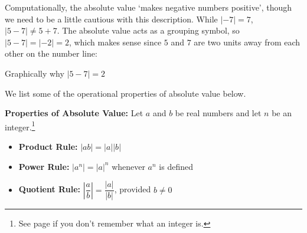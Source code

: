 \documentclass{ximera}
\begin{document}
Computationally, the absolute value `makes negative numbers positive',  though we need to be a little cautious with this description. While $|-7| = 7$, $|5-7| \neq 5+7$.  The absolute value acts as a grouping symbol, so $|5-7| = |-2| = 2$, which makes sense since $5$ and $7$ are two units away from each other on the number line:

\begin{center}

Graphically why $|5-7|=2$

\end{center}

We list some of the operational properties of absolute value below.


\begin{theorem}  \textbf{Properties of Absolute Value:} Let $a$ and $b$ be real numbers and let $n$ be an integer.\footnote{See page \pageref{setsofnumbersboxonthispage} if you don't remember what an integer is.} \label{absolutevalueprops} 

\begin{itemize}

\item {\bf Product Rule:} $|ab|= |a||b|$ 

\item {\bf Power Rule:} $\left| a^{n} \right| = |a|^{n}$ whenever $a^{n}$ is defined 

\item {\bf Quotient Rule:} $\left| \dfrac{a}{b} \right| = \dfrac{|a|}{|b|}$, provided $b \neq 0$ 

\end{itemize}

\end{theorem}
\end{document}
